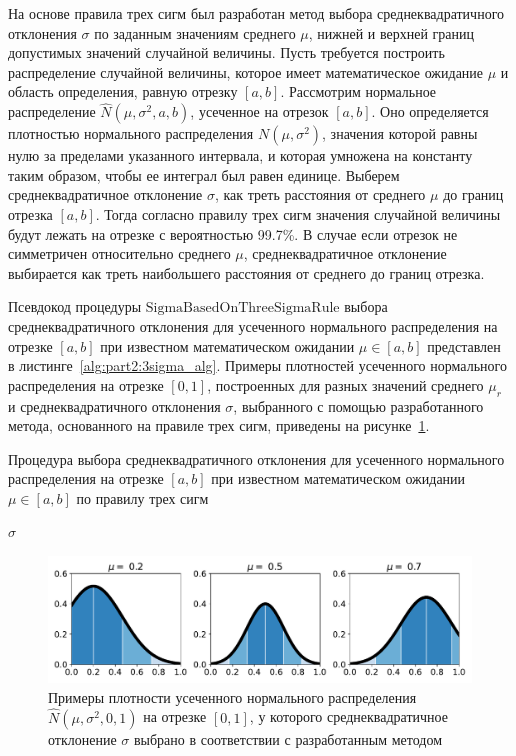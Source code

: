 На основе правила трех сигм был разработан метод выбора среднеквадратичного отклонения $\sigma$ по заданным значениям среднего $\mu$, нижней и верхней границ допустимых значений случайной величины.
Пусть требуется построить распределение случайной величины, которое имеет математическое ожидание $\mu$ и область определения, равную отрезку $[a, b]$.
Рассмотрим нормальное распределение $\hat{N}(\mu, \sigma^2, a, b)$, усеченное на отрезок $[a, b]$.
Оно определяется плотностью нормального распределения $N(\mu, \sigma^2)$, значения которой равны нулю за пределами указанного интервала, и которая умножена на константу таким образом, чтобы ее интеграл был равен единице.
Выберем среднеквадратичное отклонение $\sigma$, как треть расстояния от среднего $\mu$ до границ отрезка $[a, b]$.
Тогда согласно правилу трех сигм значения случайной величины будут лежать на отрезке с вероятностью 99.7\%.
В случае если отрезок не симметричен относительно среднего $\mu$, среднеквадратичное отклонение выбирается как треть наибольшего расстояния от среднего до границ отрезка.

Псевдокод процедуры $\text{SigmaBasedOnThreeSigmaRule}$ выбора среднеквадратичного отклонения для усеченного нормального распределения на отрезке $[a, b]$ при известном математическом ожидании $\mu \in [a, b]$ представлен в листинге~\ref{alg:part2:3sigma_alg}.
Примеры плотностей усеченного нормального распределения на отрезке $[0, 1]$, построенных для разных значений среднего $\mu_r$ и среднеквадратичного отклонения $\sigma$, выбранного с помощью разработанного метода, основанного на правиле трех сигм, приведены на рисунке~\ref{fig:part2:3sigma_example}.

\begin{algorithm}
\caption{Процедура выбора среднеквадратичного отклонения для усеченного нормального распределения на отрезке $[a, b]$ при известном математическом ожидании $\mu \in [a, b]$ по правилу трех сигм}
\label{alg:part2:3sigma_alg}
\begin{algorithmic}[1]
\State \Return $\sigma$
\EndFunction
\end{algorithmic}
\end{algorithm}

\begin{figure}[ht]
    \centering
    \includegraphics[width=\linewidth]{images/part2/genetics_algorithm/3sigma_examples.pdf}
    \caption{Примеры плотности усеченного нормального распределения~$\hat{N}(\mu, \sigma^2, 0, 1)$ на отрезке $[0,1]$, у которого среднеквадратичное отклонение $\sigma$ выбрано в соответствии с разработанным методом}
    \label{fig:part2:3sigma_example}
\end{figure}


